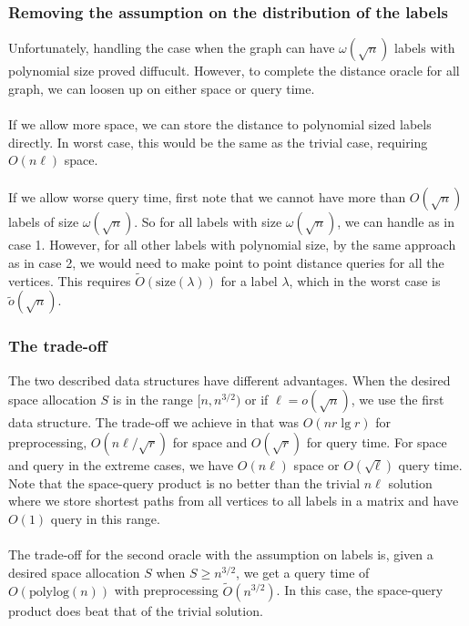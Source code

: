 \subsubsection{Removing the assumption on the distribution of the labels}
Unfortunately, handling the case when the graph can have $\omega(\sqrt{n})$ labels with
polynomial size proved diffucult. However, to complete the distance oracle for all graph,
we can loosen up on either space or query time. \\
\\
If we allow more space, we can store the distance to polynomial sized labels directly. In
worst case, this would be the same as the trivial case, requiring $O(n\ell)$ space. \\
\\
If we allow worse query time, first note that we cannot have more than $O(\sqrt{n})$
labels of size $\omega(\sqrt{n})$. So for all labels with size $\omega(\sqrt{n})$, we can
handle as in case 1. However, for all other labels with polynomial size, by the same
approach as in case 2, we would need to make point to point distance queries for all the
vertices. This requires $\tilde{O}(\text{size}(\lambda))$ for a label $\lambda$, which in
the worst case is $\tilde{o}(\sqrt{n})$.

\subsubsection{The trade-off}\label{exactoracletrade}
The two described data structures have different advantages. When the desired space
allocation $S$ is in the range $[n,n^{3/2})$ or if $\ell=o(\sqrt{n})$, we use the first
  data structure. The trade-off we achieve in that was $O(nr\lg r)$ for preprocessing,
  $O(n\ell/\sqrt{r})$ for space and $O(\sqrt{r})$ for query time. For space and query in
  the extreme cases, we have $O(n\ell)$ space or $O(\sqrt{\ell})$ query time.  \\
Note that the space-query product is no better than the trivial $n\ell$ solution where we
store shortest paths from all vertices to all labels in a matrix and have $O(1)$ query in
this range. \\
\\
The trade-off for the second oracle with the
assumption on labels is, given a desired space allocation $S$ when $S\geq n^{3/2}$, we get a
query time of $O(\text{polylog}(n))$ with preprocessing $\tilde{O}(n^{3/2})$. In this
case, the space-query product does beat that of the trivial solution.

